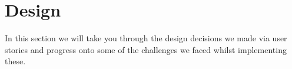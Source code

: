 \section{Design}
In this section we will take you through the design decisions we made via user stories and progress onto some of the challenges we faced whilst implementing these.
